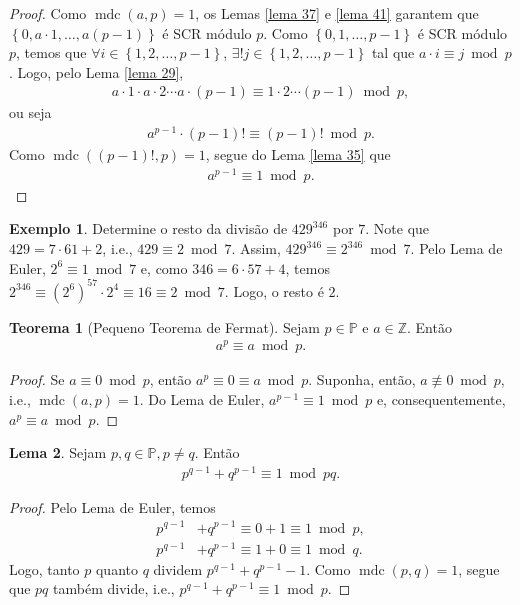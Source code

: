 \documentclass[a4paper,11pt,twoside, leqno]{article}
\DeclareMathOperator{\mdc}{mdc}
\theoremstyle{definition}
\newtheorem{theorem}{Teorema}[section]
\newtheorem{lemma}[theorem]{Lema}
\newtheorem*{example}{Exemplo}
\begin{document}
\begin{proof}
	Como $\mdc(a,p) = 1$, os Lemas \eqref{lema 37} e \eqref{lema 41} garantem que $\left\{0,a\cdot 1, \dots, a(p-1)\right\}$ é SCR módulo $p$. Como $\left\{0,1,\dots, p-1 \right\}$ é SCR módulo $p$, temos que $\forall i\in\left\{ 1,2,\dots,p-1 \right\}$, $\exists! j\in\left\{ 1,2,\dots,p-1 \right\}$ tal que $a\cdot i\equiv j\bmod p$. Logo, pelo Lema \eqref{lema 29}, 
	\begin{align*}
	a\cdot 1\cdot a\cdot 2 \cdots a\cdot (p-1)\equiv 1\cdot 2\cdots (p-1)\bmod p,
	\end{align*}
	ou seja
	\begin{align*}
	a^{p-1}\cdot(p-1)!\equiv (p-1)!\bmod p.
	\end{align*}
	Como $\mdc((p-1)!, p) = 1$, segue do Lema \eqref{lema 35} que
	\begin{align*}
	a^{p-1}\equiv 1\bmod p.
	\end{align*}
\end{proof}
\begin{example}
	Determine o resto da divisão de $429^{346}$ por $7$. Note que $429 = 7\cdot 61 + 2$, i.e., $429\equiv 2\bmod 7$. Assim, $429^{346}\equiv 2^{346}\bmod 7$. Pelo Lema de Euler, $2^6\equiv 1\bmod 7$ e, como $346 = 6\cdot 57 + 4$, temos $2^{346}\equiv (2^6)^{57}\cdot 2^4\equiv 16\equiv 2\bmod 7$. Logo, o resto é $2$.
\end{example}
\begin{theorem}[Pequeno Teorema de Fermat]
	\label{pequeno fermat}
	Sejam $p\in\mathbb{P}$ e $a\in\mathbb{Z}$. Então
	\begin{align*}
	a^p\equiv a\bmod p.
	\end{align*}
\end{theorem}
\begin{proof}
	Se $a\equiv 0\bmod p$, então $a^p\equiv 0\equiv a\bmod p$. Suponha, então, $a\not\equiv 0\bmod p$, i.e., $\mdc(a,p) = 1$. Do Lema de Euler, $a^{p-1}\equiv 1\bmod p$ e, consequentemente, $a^p\equiv a\bmod p$.
\end{proof}
\begin{lemma}
	\label{lema 43}
	Sejam $p,q\in\mathbb{P}, p\neq q$. Então
	\begin{align*}
	p^{q-1} + q^{p-1}\equiv 1\bmod pq.
	\end{align*}
\end{lemma}
\begin{proof}
	Pelo Lema de Euler, temos
	\begin{align*}
	p^{q-1} &+ q^{p-1} \equiv 0 + 1 \equiv 1\bmod p, \\
	p^{q-1} &+ q^{p-1} \equiv 1 + 0 \equiv 1\bmod q.
	\end{align*}
	Logo, tanto $p$ quanto $q$ dividem $p^{q-1} + q^{p-1} - 1$. Como $\mdc(p,q) = 1$, segue que $pq$ também divide, i.e., $p^{q-1} + q^{p-1}\equiv 1\bmod p$.
\end{proof}
\end{document}
